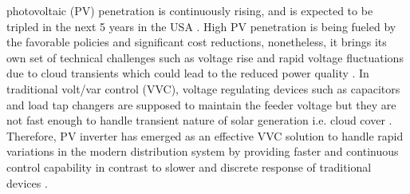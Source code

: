 \documentclass[journal]{IEEEtran}
\begin{document}
 photovoltaic (PV) penetration is continuously rising, and is expected to be tripled in the next 5 years in the USA \cite{seia_2016}.
High PV penetration is being fueled by the favorable policies and significant cost reductions, nonetheless, it brings its own set of technical challenges such as voltage rise and rapid voltage fluctuations due to cloud transients which could lead to the reduced power quality \cite{coster_integration_2011,mather_high-penetration_2016}. %
In traditional volt/var control (VVC), voltage regulating devices such as capacitors and load tap changers are supposed to maintain the feeder voltage but they are not fast enough to handle transient nature of solar generation i.e. cloud cover \cite{yeh_adaptive_2012,robbins_two-stage_2013,mcgranaghan_advanced_2008}. Therefore, PV inverter has emerged as an effective VVC solution to handle rapid variations in the modern distribution system by providing faster and continuous control capability in contrast to slower and discrete response of traditional devices \cite{turitsyn_options_2011,bollen_voltage_2005,carvalho_distributed_2008}.
\end{document}
